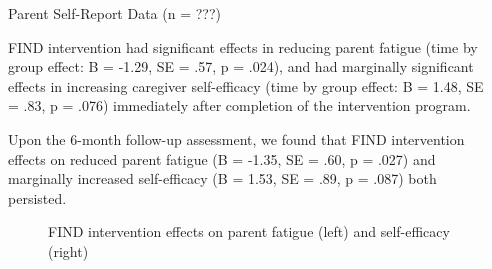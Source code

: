\documentclass[final]{beamer}
\newlength{\sepwidth}
\newlength{\colwidth}
\newcommand{\separatorcolumn}{\begin{column}{\sepwidth}\end{column}}
\begin{document}
\begin{frame}[t]
\vspace{0cm} %
\begin{columns}[t]
\separatorcolumn

\begin{column}{\colwidth}
  \begin{block}{Parent Self-Report Data (n = ???)}
    
    FIND intervention had significant effects in reducing parent fatigue (time by group effect: B = -1.29, SE = .57, p = .024), and had marginally significant effects in increasing caregiver self-efficacy (time by group effect: B = 1.48, SE = .83, p = .076) immediately after completion of the intervention program. 
    
    Upon the 6-month follow-up assessment, we found that FIND intervention effects on reduced parent fatigue (B = -1.35, SE = .60, p = .027) and marginally increased self-efficacy (B = 1.53, SE = .89, p = .087) both persisted. 
    
    \begin{figure}[ht]
        \centering
        \caption{FIND intervention effects on parent fatigue (left) and self-efficacy (right)}
        \label{fig:combined}
    \end{figure} 
    

\end{block}
\end{column}
\end{columns}
\end{frame}
\end{document}
